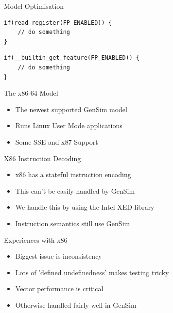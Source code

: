 \begin{frame}[fragile]{Model Optimisation}
\begin{lstlisting}
if(read_register(FP_ENABLED)) {
	// do something
}
\end{lstlisting}

\begin{lstlisting}
if(__builtin_get_feature(FP_ENABLED)) {
	// do something
}
\end{lstlisting}

\end{frame}


\begin{frame}{The x86-64 Model}

\begin{itemize}
\item The newest supported GenSim model
\item Runs Linux User Mode applications
\item Some SSE and x87 Support
\end{itemize}

\end{frame}

\begin{frame}{X86 Instruction Decoding}
\begin{itemize}
\item x86 has a stateful instruction encoding
\item This can't be easily handled by GenSim
\item We handle this by using the Intel XED library
\item Instruction semantics still use GenSim
\end{itemize}
\end{frame}

\begin{frame}{Experiences with x86}

\begin{itemize}
\item Biggest issue is inconsistency
\item Lots of 'defined undefinedness' makes testing tricky
\item Vector performance is critical
\item Otherwise handled fairly well in GenSim
\end{itemize}

\end{frame}

